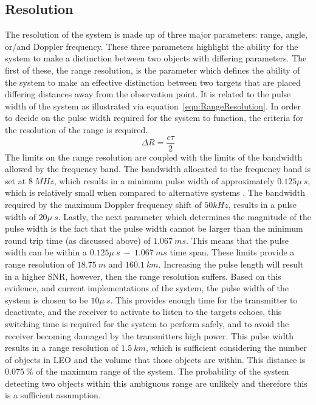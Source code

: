 \documentclass[11pt]{witseiepaper}
\begin{document}
\begin{bibunit}[witseie]
\subsection{Resolution} \label{sec:Resolution}
The resolution of the system is made up of three major parameters: range, angle, or/and Doppler frequency. These three parameters highlight the ability for the system to make a distinction between two objects with differing parameters.
The first of these, the range resolution, is the parameter which defines the ability of the system to make an  effective distinction between two targets that are placed differing distances away from the observation point. It is related to the pulse width of the system as illustrated via equation~\ref{eqn:RangeResolution}. In order to decide on the pulse width required for the system to function, the criteria for the resolution of the range is required.
\begin{equation} \label{eqn:RangeResolution}
\Delta R = \frac{c \tau}{2}
\end{equation}
The limits on the range resolution are coupled with the limits of the bandwidth allowed by the frequency band. 
The bandwidth allocated to the frequency band is set at $8~MHz$, which results in a minimum pulse width of approximately $0.125 \mu~s$, which is relatively small when compared to alternative systems \cite{AMISR, EISCAT, SIMO, telescope, BeamForming, OrbitDetermination, PlanarArray}. The bandwidth required by the maximum Doppler frequency shift of $50 kHz$, results in a pulse width of $20\mu~s$.
Lastly, the next parameter which determines the magnitude of the pulse width is the fact that the pulse width cannot be larger than the minimum round trip time (as discussed above) of $1.067~ms$. 
This means that the pulse width can be within a $0.125 \mu~s~-~1.067~ms$ time span.
These limits provide a range resolution of $18.75~m$ and $160.1~km$. Increasing the pulse length will result in a higher SNR, however, then the range resolution suffers.
Based on this evidence, and current implementations of the system, the pulse width of the system is chosen to be $10\mu~s$. This provides enough time for the transmitter to deactivate, and the receiver to activate to listen to the targets echoes, this switching time is required for the system to perform safely, and to avoid the receiver becoming damaged by the transmitters high power.
This pulse width results in a range resolution of $1.5~km$, which is sufficient considering the number of objects in LEO and the volume that those objects are within. This distance is $0.075~\%$ of the maximum range of the system. The probability of the system detecting two objects within this ambiguous range are unlikely and therefore this is a sufficient assumption.%


\end{bibunit}
\end{document}
